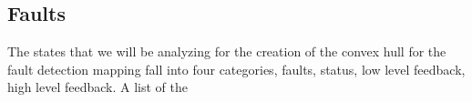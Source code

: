\subsection{Faults}
\label{sec:faults}
The states that we will be analyzing for the creation of the convex hull for
the fault detection mapping fall into four categories, faults, status, low
level feedback, high level feedback.  A list of the

